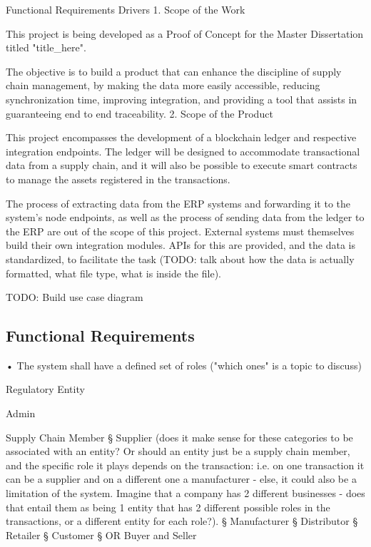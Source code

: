 {Functional Requirements Drivers
	1. Scope of the Work
		\par This project is being developed as a Proof of Concept for the Master Dissertation titled "title\_here".
		\par The objective is to build a product that can enhance the discipline of supply chain management, by making the data more easily accessible, reducing synchronization time, improving integration, and providing a tool that assists in guaranteeing end to end traceability.
	2. Scope of the Product
		\par This project encompasses the development of a blockchain ledger and respective integration endpoints. The ledger will be designed to accommodate transactional data from a supply chain, and it will also be possible to execute smart contracts to manage the assets registered in the transactions.
		\par The process of extracting data from the ERP systems and forwarding it to the system's node endpoints, as well as the process of sending data from the ledger to the ERP are out of the scope of this project. External systems must themselves build their own integration modules. APIs for this are provided, and the data is standardized, to facilitate the task (TODO: talk about how the data is actually formatted, what file type, what is inside the file).
		\par TODO: Build use case diagram
	
\subsection{Functional  Requirements}
	• The system shall have a defined set of roles ("which ones" is a topic to discuss)
		\par Regulatory Entity
		\par Admin
		\par Supply Chain Member
			§ Supplier  (does it make sense for these categories to be associated with an entity? Or should an entity just be a supply chain member, and the specific role it plays depends on the transaction: i.e. on one transaction it can be a supplier and on a different one a manufacturer - else, it could also be a limitation of the system. Imagine that a company has 2 different businesses - does that entail them as being 1 entity that has 2 different possible roles in the transactions, or a different entity for each role?).
			§ Manufacturer
			§ Distributor
			§ Retailer
			§ Customer
			§ OR  Buyer and Seller
		
}
